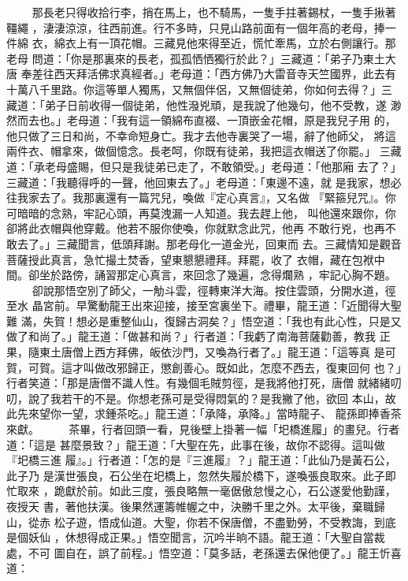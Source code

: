 \begin{pinyinscope}
{　　
那長老只得收拾行李，捎在馬上，也不騎馬，一隻手拄著錫杖，一隻手揪著韁繩
，淒淒涼涼，往西前進。行不多時，只見山路前面有一個年高的老母，捧一件綿
衣，綿衣上有一頂花帽。三藏見他來得至近，慌忙牽馬，立於右側讓行。那老母
問道：「你是那裏來的長老，孤孤恓恓獨行於此？」三藏道：「弟子乃東土大唐
奉差往西天拜活佛求真經者。」老母道：「西方佛乃大雷音寺天竺國界，此去有
十萬八千里路。你這等單人獨馬，又無個伴侶，又無個徒弟，你如何去得？」三
藏道：「弟子日前收得一個徒弟，他性潑兇頑，是我說了他幾句，他不受教，遂
渺然而去也。」老母道：「我有這一領綿布直裰、一頂嵌金花帽，原是我兒子用
的，他只做了三日和尚，不幸命短身亡。我才去他寺裏哭了一場，辭了他師父，
將這兩件衣、帽拿來，做個憶念。長老呵，你既有徒弟，我把這衣帽送了你罷。」
三藏道：「承老母盛賜，但只是我徒弟已走了，不敢領受。」老母道：「他那廂
去了？」三藏道：「我聽得呼的一聲，他回東去了。」老母道：「東邊不遠，就
是我家，想必往我家去了。我那裏還有一篇咒兒，喚做『定心真言』，又名做
『緊箍兒咒』。你可暗暗的念熟，牢記心頭，再莫洩漏一人知道。我去趕上他，
叫他還來跟你，你卻將此衣帽與他穿戴。他若不服你使喚，你就默念此咒，他再
不敢行兇，也再不敢去了。」三藏聞言，低頭拜謝。那老母化一道金光，回東而
去。三藏情知是觀音菩薩授此真言，急忙撮土焚香，望東懇懇禮拜。拜罷，收了
衣帽，藏在包袱中間。卻坐於路傍，誦習那定心真言，來回念了幾遍，念得爛熟
，牢記心胸不題。
　　
卻說那悟空別了師父，一觔斗雲，徑轉東洋大海。按住雲頭，分開水道，徑至水
晶宮前。早驚動龍王出來迎接，接至宮裏坐下。禮畢，龍王道：「近聞得大聖難
滿，失賀！想必是重整仙山，復歸古洞矣？」悟空道：「我也有此心性，只是又
做了和尚了。」龍王道：「做甚和尚？」行者道：「我虧了南海菩薩勸善，教我
正果，隨東土唐僧上西方拜佛，皈依沙門，又喚為行者了。」龍王道：「這等真
是可賀，可賀。這才叫做改邪歸正，懲創善心。既如此，怎麼不西去，復東回何
也？」行者笑道：「那是唐僧不識人性。有幾個毛賊剪徑，是我將他打死，唐僧
就緒緒叨叨，說了我若干的不是。你想老孫可是受得悶氣的？是我撇了他，欲回
本山，故此先來望你一望，求鍾茶吃。」龍王道：「承降，承降。」當時龍子、
龍孫即捧香茶來獻。
　　
茶畢，行者回頭一看，見後壁上掛著一幅「圯橋進履」的畫兒。行者道：「這是
甚麼景致？」龍王道：「大聖在先，此事在後，故你不認得。這叫做『圯橋三進
履』。」行者道：「怎的是『三進履』？」龍王道：「此仙乃是黃石公，此子乃
是漢世張良，石公坐在圯橋上，忽然失履於橋下，遂喚張良取來。此子即忙取來
，跪獻於前。如此三度，張良略無一毫倨傲怠慢之心，石公遂愛他勤謹，夜授天
書，著他扶漢。後果然運籌帷幄之中，決勝千里之外。太平後，棄職歸山，從赤
松子遊，悟成仙道。大聖，你若不保唐僧，不盡勤勞，不受教誨，到底是個妖仙
，休想得成正果。」悟空聞言，沉吟半晌不語。龍王道：「大聖自當裁處，不可
圖自在，誤了前程。」悟空道：「莫多話，老孫還去保他便了。」龍王忻喜道：
}
\end{pinyinscope}
